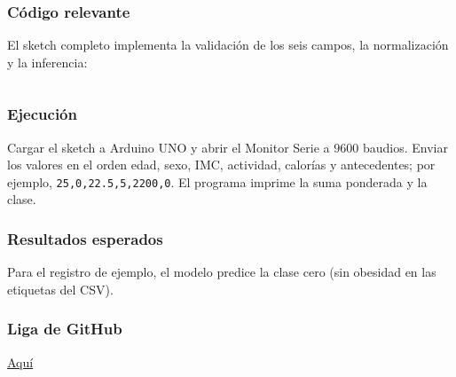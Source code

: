 \documentclass{article}[12pt,a4paper]
\begin{document}
\subsubsection{Código relevante}

El sketch completo implementa la validación de los seis campos, la normalización
y la inferencia:

\inputminted{cpp}{../clase011/obesidad.ino}

\subsubsection{Ejecución}

Cargar el sketch a Arduino UNO y abrir el Monitor Serie a \(9600\) baudios.
Enviar los valores en el orden
edad, sexo, IMC, actividad, calorías y antecedentes; por ejemplo,
\texttt{25,0,22.5,5,2200,0}. El programa imprime la suma ponderada y la clase.

\subsubsection{Resultados esperados}

Para el registro de ejemplo, el modelo predice la clase cero (sin obesidad en las
etiquetas del CSV).

\subsubsection{Liga de \textbf{GitHub}}

\href{https://github.com/MarcosHCK/master-programming/tree/master/clase011}{Aquí \faGithubSquare}
\end{document}
